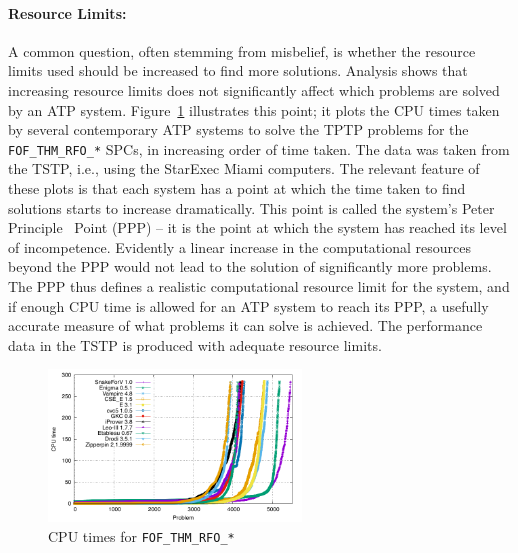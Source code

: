 \documentclass{easychair}
\begin{document}
\paragraph{Resource Limits:}
A common question, often stemming from misbelief, is whether the resource limits used should 
be increased to find more solutions.
Analysis shows that increasing resource limits does not significantly affect which problems 
are solved by an ATP system. 
Figure~\ref{PPPPlot} illustrates this point; it plots the CPU times taken by several contemporary 
ATP systems to solve the TPTP problems for the {\tt FOF\_THM\_RFO\_*} SPCs, in increasing order 
of time taken. 
The data was taken from the TSTP, i.e., using the StarExec Miami computers.
The relevant feature of these plots is that each system has a point at which the time taken to 
find solutions starts to increase dramatically. 
This point is called the system's Peter Principle~\cite{PH69} Point (PPP) -- it is the point at 
which the system has reached its level of incompetence. 
Evidently a linear increase in the computational resources beyond the PPP would not lead to the 
solution of significantly more problems. 
The PPP thus defines a realistic computational resource limit for the system, and if enough CPU 
time is allowed for an ATP system to reach its PPP, a usefully accurate measure of what problems 
it can solve is achieved.
The performance data in the TSTP is produced with adequate resource limits.

\begin{figure}[htb]
\centering
\includegraphics[width=0.6\textwidth]{FOF_THM_RFO_PPP.pdf}
\vspace*{-1em}
\caption{CPU times for {\tt FOF\_THM\_RFO\_*}}
\label{PPPPlot}
\end{figure}
\end{document}
